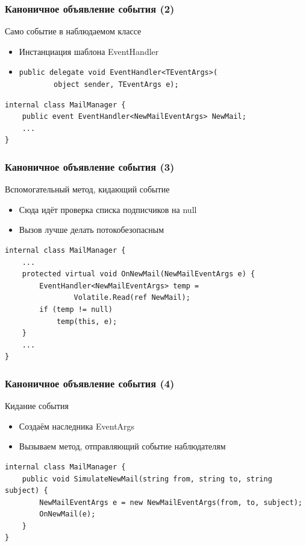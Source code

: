 \documentclass[xetex,mathserif,serif]{beamer}
\begin{document}
	\begin{frame}[fragile]
		\frametitle{Каноничное объявление события (2)}
		Само событие в наблюдаемом классе
		\begin{itemize}
			\item Инстанциация шаблона EventHandler
			\item 
				\begin{verbatim}
public delegate void EventHandler<TEventArgs>(
        object sender, TEventArgs e);
				\end{verbatim}
		\end{itemize}

		\vspace{7mm}
		\begin{verbatim}
internal class MailManager {
    public event EventHandler<NewMailEventArgs> NewMail;
    ...
}
		\end{verbatim}
	\end{frame}

	\begin{frame}[fragile]
		\frametitle{Каноничное объявление события (3)}
		Вспомогательный метод, кидающий событие
		\begin{itemize}
			\item Сюда идёт проверка списка подписчиков на null
			\item Вызов лучше делать потокобезопасным
		\end{itemize}
		\vspace{5mm}
		\begin{verbatim}
internal class MailManager {
    ...
    protected virtual void OnNewMail(NewMailEventArgs e) {
        EventHandler<NewMailEventArgs> temp = 
                Volatile.Read(ref NewMail);
        if (temp != null) 
            temp(this, e);
    }
    ...
}
		\end{verbatim}
	\end{frame}

	\begin{frame}[fragile]
		\frametitle{Каноничное объявление события (4)}
		Кидание события
		\begin{itemize}
			\item Создаём наследника EventArgs
			\item Вызываем метод, отправляющий событие наблюдателям
		\end{itemize}
		\vspace{5mm}
		\begin{verbatim}
internal class MailManager {
    public void SimulateNewMail(string from, string to, string subject) {
        NewMailEventArgs e = new NewMailEventArgs(from, to, subject);
        OnNewMail(e);
    }
}
		\end{verbatim}
	\end{frame}
\end{document}
